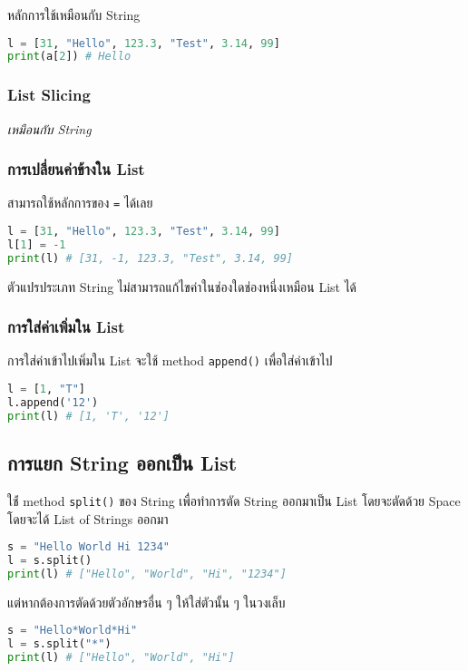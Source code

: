 หลักการใช้เหมือนกับ String

\begin{lstlisting}[language=Python]
l = [31, "Hello", 123.3, "Test", 3.14, 99]
print(a[2]) # Hello
\end{lstlisting}

\subsubsection{List Slicing}

\textit{เหมือนกับ String}

\subsubsection{การเปลี่ยนค่าข้างใน List}

สามารถใช้หลักการของ \verb|=| ได้เลย

\begin{lstlisting}[language=Python]
l = [31, "Hello", 123.3, "Test", 3.14, 99]
l[1] = -1
print(l) # [31, -1, 123.3, "Test", 3.14, 99]
\end{lstlisting}

\begin{remark}
    ตัวแปรประเภท String ไม่สามารถแก้ไขค่าในช่องใดช่องหนี่งเหมือน List ได้
\end{remark}

\subsubsection{การใส่ค่าเพิ่มใน List}

การใส่ค่าเข้าไปเพิ่มใน List จะใช้ method \verb|append()| เพื่อใส่ค่าเข้าไป

\begin{lstlisting}[language=Python]
l = [1, "T"]
l.append('12')
print(l) # [1, 'T', '12']
\end{lstlisting}

\subsection{การแยก String ออกเป็น List}

ใช้่ method \verb|split()| ของ String เพื่อทำการตัด String ออกมาเป็น List โดยจะตัดด้วย Space โดยจะได้ List of Strings ออกมา

\begin{lstlisting}[language=Python]
s = "Hello World Hi 1234"
l = s.split()
print(l) # ["Hello", "World", "Hi", "1234"]
\end{lstlisting}

แต่หากต้องการตัดด้วยตัวอักษรอื่น ๆ ให้ใส่ตัวนั้น ๆ ในวงเล็บ

\begin{lstlisting}[language=Python]
s = "Hello*World*Hi"
l = s.split("*")
print(l) # ["Hello", "World", "Hi"]
\end{lstlisting}